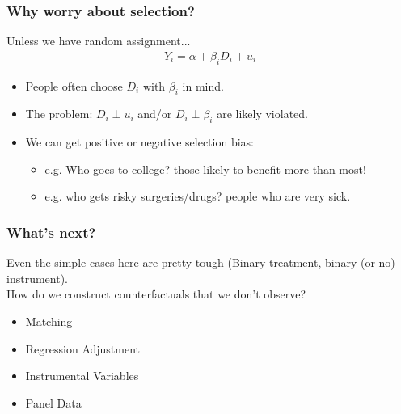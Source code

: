 \documentclass[aspectratio=169,11pt]{beamer}
\begin{document}
\begin{frame}
\frametitle{Why worry about selection?}
Unless we have random assignment...
\begin{align*}
Y_i = \alpha + \beta_i D_i + u_i
\end{align*}

\begin{itemize}
\item People often choose $D_i$ with $\beta_i$ in mind.
\item The problem: $D_i \perp u_i$ and/or $D_i \perp \beta_i$ are likely violated.
\item We can get positive or negative selection bias:
\begin{itemize}
\item e.g. Who goes to college? those likely to benefit more than most!
\item e.g. who gets risky surgeries/drugs? people who are very sick.
\end{itemize}
\end{itemize}
\end{frame}

\begin{frame}
\frametitle{What's next?}
Even the simple cases here are pretty tough (Binary treatment, binary (or no) instrument).\\

How do we construct counterfactuals that we don't observe?
\begin{itemize}
\item Matching
\item Regression Adjustment
\item Instrumental Variables
\item Panel Data
\end{itemize}
\end{frame}
\end{document}
